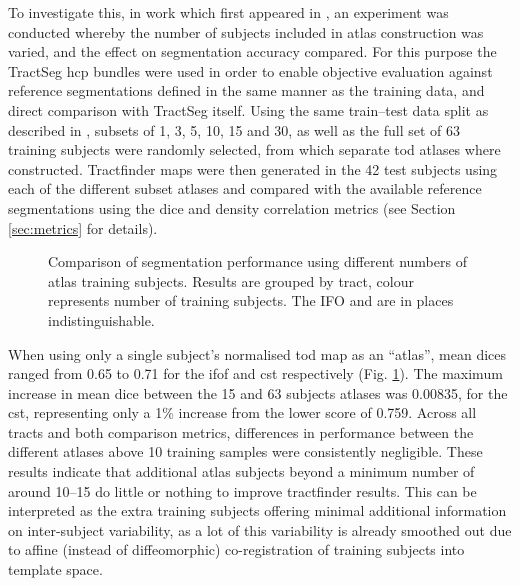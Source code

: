\documentclass[12pt,phd,a4paper,twoside]{ucl_thesis}
\renewcommand{\textcite}[2][]{
\ifthenelse { \equal {#1} {} }  {\citeauthor{#2}\autocite{#2}}   {\citeauthor{#1}\autocite{#2}}}
\providecommand{\DIFdeltex}[1]{{\protect\color{red} \scriptsize #1}} %
\providecommand{\DIFdelbegin}{} %
\providecommand{\DIFdelend}{} %
\providecommand{\DIFdel}[1]{\texorpdfstring{\DIFdeltex{#1}}{}} %
\newcommand{\DIFscaledelfig}{0.5}
\newlength{\DIFdelgraphicswidth} %
\newlength{\DIFdelgraphicsheight} %
\newcommand{\DIFdelincludegraphics}[2][]{%
\sbox{\DIFdelgraphicsbox}{\DIFOincludegraphics[#1]{#2}}%
\settoboxwidth{\DIFdelgraphicswidth}{\DIFdelgraphicsbox} %
\settoboxtotalheight{\DIFdelgraphicsheight}{\DIFdelgraphicsbox} %
\scalebox{\DIFscaledelfig}{%
\parbox[b]{\DIFdelgraphicswidth}{\usebox{\DIFdelgraphicsbox}\\[-\baselineskip] \rule{\DIFdelgraphicswidth}{0em}}\llap{\resizebox{\DIFdelgraphicswidth}{\DIFdelgraphicsheight}{%
\setlength{\unitlength}{\DIFdelgraphicswidth}%
\begin{picture}(1,1)%
\thicklines\linethickness{2pt} %
{\color[rgb]{1,0,0}\put(0,0){\framebox(1,1){}}}%
{\color[rgb]{1,0,0}\put(0,0){\line( 1,1){1}}}%
{\color[rgb]{1,0,0}\put(0,1){\line(1,-1){1}}}%
\end{picture}%
}\hspace*{3pt}}} %
} %
\DeclareRobustCommand{\DIFdelbegin}{\DIFOdelbegin \let\includegraphics\DIFdelincludegraphics} %
\DeclareRobustCommand{\DIFdelend}{\DIFOaddend \let\includegraphics\DIFOincludegraphics} %
\begin{document}
To investigate this, in work which first appeared in \textcite{Young2023}, an experiment was conducted whereby the number of subjects included in atlas construction was varied, and the effect on segmentation accuracy compared.
For this purpose the TractSeg \gls{hcp} bundles were used in order to enable objective evaluation against reference segmentations defined in the same manner as the training data, and direct comparison with TractSeg itself.
Using the same train--test data split as described in \textcite{Wasserthal2018b}, subsets of 1, 3, 5, 10, 15 and 30, as well as the full set of 63 training subjects were randomly selected, from which separate \gls{tod} atlases where constructed.
Tractfinder maps were then generated in the 42 test subjects using each of the different subset atlases and compared with the available reference segmentations using the \gls{dice} \DIFdelbegin \DIFdel{and density correlation metrics }\DIFdelend (see Section \ref{sec:metrics} for details).

\begin{figure}[htb!]
    \centering
    \caption[Tractfinder performance against number of atlas training subjects]{Comparison of segmentation performance using different numbers of atlas training subjects. Results are grouped by tract, colour represents number of training subjects. The IFO and  are in places indistinguishable. }
    \label{fig:ntrain}
\end{figure}

When using only a single subject's normalised \gls{tod} map as an ``atlas'', mean \glspl{dice} ranged from 0.65 to 0.71 for the \gls{ifof} and \gls{cst} respectively (Fig. \ref{fig:ntrain}).
The maximum increase in mean \gls{dice} between the 15 and 63 subjects atlases was 0.00835, for the \gls{cst}, representing only a 1\% increase from the lower score of 0.759.
Across all tracts and both comparison metrics, differences in performance between the different atlases above 10 training samples were consistently negligible.
These results indicate that additional atlas subjects beyond a minimum number of around 10--15 do little or nothing to improve tractfinder results.
This can be interpreted as the extra training subjects offering minimal additional information on inter-subject variability, as a lot of this variability is already smoothed out due to affine (instead of diffeomorphic) co-registration of training subjects into template space.
\end{document}
